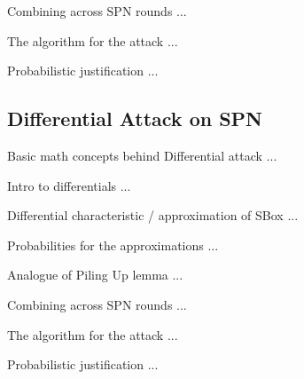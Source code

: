\documentclass[9pt]{beamer}
\begin{document}
\begin{frame}
Combining across SPN rounds ... 

\end{frame}

\begin{frame}
The algorithm for the attack ... 

\end{frame}

\begin{frame}
Probabilistic justification ...

\end{frame}

\subsection{Differential Attack on SPN}
\begin{frame}
Basic math concepts behind Differential attack ...

\end{frame}

\begin{frame}
Intro to differentials ... 

\end{frame}

\begin{frame}
Differential characteristic / approximation of SBox ...

\end{frame}

\begin{frame}
Probabilities for the approximations ...

\end{frame}

\begin{frame}
Analogue of Piling Up lemma ...

\end{frame}

\begin{frame}
Combining across SPN rounds ... 

\end{frame}

\begin{frame}
The algorithm for the attack ... 

\end{frame}

\begin{frame}
Probabilistic justification ...

\end{frame}
\end{document}
